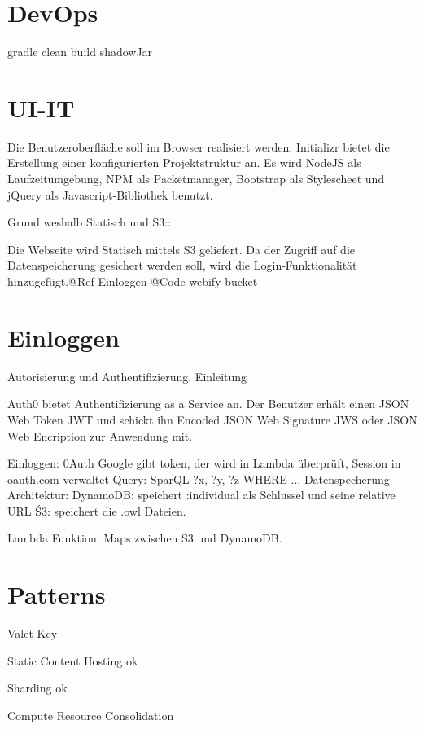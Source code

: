 \documentclass[
12pt,
english,
ngerman,
headsepline,
twoside,
openright,
numbers=noenddot,version=first
]{scrreprt}
\begin{document}
\section{DevOps}
gradle clean build shadowJar


\section{UI-IT}

Die Benutzeroberfläche soll im Browser realisiert werden. Initializr bietet die Erstellung einer konfigurierten Projektstruktur an. Es wird NodeJS als Laufzeitumgebung, NPM als Packetmanager, Bootstrap als Stylescheet und jQuery als Javascript-Bibliothek benutzt.

Grund weshalb Statisch und S3::

Die Webseite wird Statisch mittels S3 geliefert. Da der Zugriff auf die Datenspeicherung gesichert werden soll, wird die Login-Funktionalität hinzugefügt.@Ref Einloggen
@Code webify bucket



\section{Einloggen}

Autorisierung und Authentifizierung. Einleitung

Auth0 bietet Authentifizierung as a Service an. Der Benutzer erhält einen JSON Web Token JWT und schickt ihn Encoded JSON Web Signature JWS oder JSON Web Encription zur Anwendung mit.


Einloggen: 0Auth Google gibt token, der wird in Lambda überprüft, Session in oauth.com verwaltet
Query: SparQL ?x, ?y, ?z WHERE ...
Datenspecherung Architektur:
DynamoDB: speichert :individual als Schlussel und seine relative URL
Ś3: speichert die .owl Dateien.

Lambda Funktion: Maps zwischen S3 und DynamoDB.

\section{Patterns}

Valet Key \cite{homer2014cloud}

Static Content Hosting ok

Sharding ok

Compute Resource Consolidation
\end{document}

